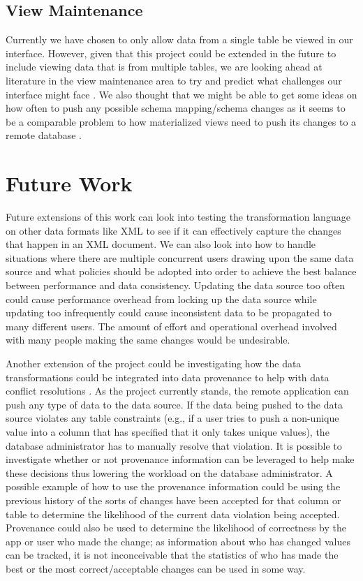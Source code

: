 \documentclass[12pt]{article}
\begin{document}
\subsection{View Maintenance}
Currently we have chosen to only allow data from a single table be viewed in our interface. However, given that this project could be extended in the future to include viewing data that is from multiple tables, we are looking ahead at literature in the view maintenance area to try and predict what challenges our interface might face \cite{ agrawal1997efficient, agrawal2009asynchronous, gupta1999materialized, zhou2007lazy}. We also thought that we might be able to get some ideas on how often to push any possible schema mapping/schema changes as it seems to be a comparable problem to how materialized views need to push its changes to a remote database \cite{agrawal1997efficient, agrawal2009asynchronous, zhou2007lazy}. 


\section{Future Work}
Future extensions of this work can look into testing the transformation language on other data formats like XML to see if it can effectively capture the changes that happen in an XML document. We can also look into how to handle situations where there are multiple concurrent users drawing upon the same data source and what policies should be adopted into order to achieve the best balance between performance and data consistency. Updating the data source too often could cause performance overhead from locking up the data source while updating too infrequently could cause inconsistent data to be propagated to many different users. The amount of effort and operational overhead involved with many people making the same changes would be undesirable. 

Another extension of the project could be investigating how the data transformations could be integrated into data provenance to help with data conflict resolutions \cite{arniThesis}. As the project currently stands, the remote application can push any type of data to the data source. If the data being pushed to the data source violates any table constraints (e.g., if a user tries to push a non-unique value into a column that has specified that it only takes unique values), the database administrator has to manually resolve that violation. It is possible to investigate whether or not provenance information can be leveraged to help make these decisions thus lowering the workload on the database administrator. A possible example of how to use the provenance information could be using the previous history of the sorts of changes have been accepted for that column or table to determine the likelihood of the current data violation being accepted. Provenance could also be used to determine the likelihood of correctness by the app or user who made the change; as information about who has changed values can be tracked, it is not inconceivable that the statistics of who has made the best or the most correct/acceptable changes can be used in some way.



\end{document}

